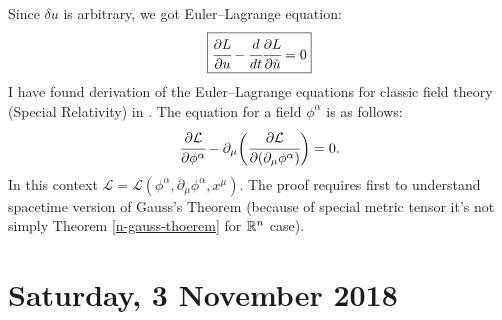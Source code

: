 \documentclass[main.tex]{subfiles}
\begin{document}
Since $\delta u$ is arbitrary, we got Euler–Lagrange equation:
\begin{equation}
\boxed{
\cfrac{\partial L}{\partial u} -
\cfrac{d}{dt}\cfrac{\partial L}{\partial \dot{u}} = 0}
\end{equation}
I have found derivation of the Euler–Lagrange equations for classic field theory (Special Relativity) in \cite[see][8.5.2 The Hamilton Principle of Stationary Action]{dauria-trigiante2012}.
The equation for a field $\phi^\alpha$ is as follows:
\begin{equation}
\label{euler-lagrange-classic-field-I}
\cfrac{\partial \mathcal{L}}{\partial \phi^\alpha} - \partial_\mu\bigg(\cfrac{\partial \mathcal{L}}{\partial (\partial_\mu \phi^\alpha)}\bigg) = 0.
\end{equation}
In this context $\mathcal{L} = \mathcal{L}(\phi^\alpha, \partial_\mu \phi^\alpha, x^\mu)$.
The proof requires first to understand spacetime version of Gauss's Theorem (because of special metric tensor it's not simply Theorem \ref{n-gauss-thoerem} for $\mathbb{R}^n$ case).
\section{Saturday, 3 November 2018}
\end{document}
